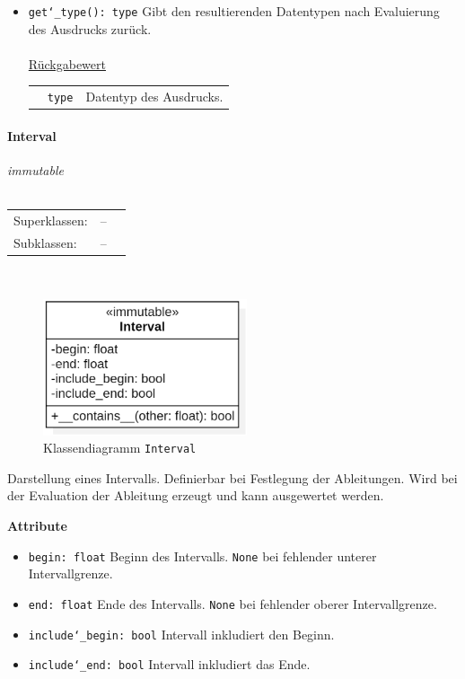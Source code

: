 \documentclass{article}
\newcommand{\classheader}[2][]{\paragraph{#2}
\mbox{}\textit{#1}\\\\}
\begin{document}
\begin{itemize}
\item \texttt{get\char`_type(): type} \newline Gibt den resultierenden Datentypen nach Evaluierung des Ausdrucks zurück.
\\\\
\underline{{Rückgabewert}}

\begin{tabular}{lll}
 & \texttt{type} & Datentyp des Ausdrucks. \\
\end{tabular}
\end{itemize}


\newpage
\classheader[\flqq{}immutable\frqq]{Interval}\label{cls:Interval}
\begin{tabular}{lll}
 Superklassen: & --\\
 Subklassen: & --\\
\end{tabular}\\
\begin{figure}[H]%
    \centering
    \includegraphics[width=6cm]{entwurf/Entwurf_dokument/img/cls/model/Interval.png}
    \caption{Klassendiagramm \texttt{Interval}}
\end{figure}

Darstellung eines Intervalls. Definierbar bei Festlegung der Ableitungen. Wird bei der Evaluation der Ableitung erzeugt und kann ausgewertet werden.
\newline \newline

\textbf{{Attribute}}
\begin{itemize}
\item \texttt{begin: float} \newline Beginn des Intervalls. \texttt{None} bei fehlender unterer Intervallgrenze. 
\item \texttt{end: float} \newline Ende des Intervalls. \texttt{None} bei fehlender oberer Intervallgrenze. 
\item \texttt{include\char`_begin: bool} \newline Intervall inkludiert den Beginn.
\item \texttt{include\char`_end: bool} \newline Intervall inkludiert das Ende.
\\\\
\end{itemize}
\end{document}
